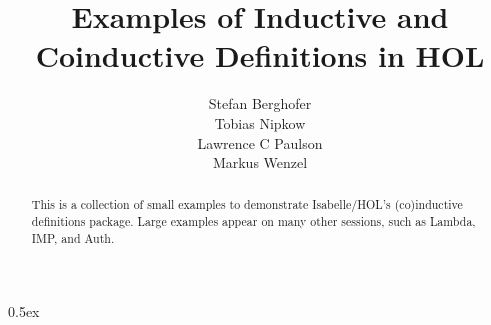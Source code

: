 \documentclass[11pt,a4paper]{article}
\begin{document}
\title{Examples of Inductive and Coinductive Definitions in HOL}
\author{Stefan Berghofer \\ Tobias Nipkow \\ Lawrence C Paulson \\ Markus Wenzel}
\maketitle

\begin{abstract}
  This is a collection of small examples to demonstrate Isabelle/HOL's
  (co)inductive definitions package.  Large examples appear on many other
  sessions, such as Lambda, IMP, and Auth.
\end{abstract}

\tableofcontents
\newpage

\parindent 0pt\parskip 0.5ex




\end{document}
